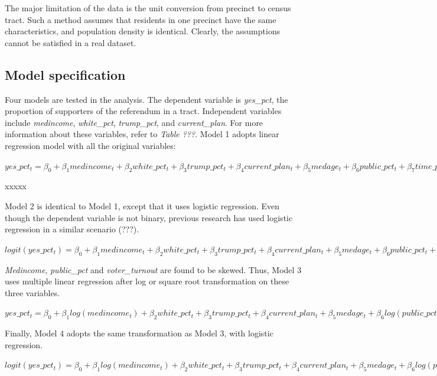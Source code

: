 \documentclass[
]{article}
\begin{document}
The major limitation of the data is the unit conversion from precinct to
census tract. Such a method assumes that residents in one precinct have
the same characteristics, and population density is identical. Clearly,
the assumptions cannot be satisfied in a real dataset.

\hypertarget{model-specification}{%
\subsection{Model specification}\label{model-specification}}

Four models are tested in the analysis. The dependent variable is
\emph{yes\_pct}, the proportion of supporters of the referendum in a
tract. Independent variables include \emph{medincome},
\emph{white\_pct}, \emph{trump\_pct}, and \emph{current\_plan}. For more
information about these variables, refer to \emph{Table ???}. Model 1
adopts linear regression model with all the original variables:

\(yes\_pct_t = \beta_0+\beta_1medincome_t+\beta_2white\_pct_t+\beta_3trump\_pct_t+\beta_4current\_plan_t+\beta_5medage_t+\beta_6public\_pct_t+\beta_7time\_pct_t+\beta_8voter\_turnout_t+\epsilon_t\)

xxxxx

Model 2 is identical to Model 1, except that it uses logistic
regression. Even though the dependent variable is not binary, previous
research has used logistic regression in a similar scenario (???).

\(logit(yes\_pct_t) = \beta_0+\beta_1medincome_t+\beta_2white\_pct_t+\beta_3trump\_pct_t+\beta_4current\_plan_t+\beta_5medage_t+\beta_6public\_pct_t+\beta_7time\_pct_t+\beta_8voter\_turnout_t+\epsilon_4\)

\emph{Medincome}, \emph{public\_pct} and \emph{voter\_turnout} are found
to be skewed. Thus, Model 3 uses multiple linear regression after log or
square root transformation on these three variables.

\(yes\_pct_t = \beta_0+\beta_1log(medincome_t)+\beta_2white\_pct_t+\beta_3trump\_pct_t+\beta_4current\_plan_t+\beta_5medage_t+\beta_6log(public\_pct_t + 0,01)+\beta_7time\_pct_t+\beta_8\sqrt{voter\_turnout_t}+\epsilon_t\)

Finally, Model 4 adopts the same transformation as Model 3, with
logistic regression.

\(logit(yes\_pct_t) = \beta_0+\beta_1log(medincome_t)+\beta_2white\_pct_t+\beta_3trump\_pct_t+\beta_4current\_plan_t+\beta_5medage_t+\beta_6log(public\_pct_t + 0,01)+\beta_7time\_pct_t+\beta_8\sqrt{voter\_turnout_t}+\epsilon_t\)
\end{document}
